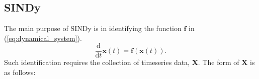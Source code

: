 \documentclass[10pt]{paper}
\begin{document}

\subsection{SINDy} \label{sec:SINDy}
The main purpose of SINDy is in identifying the function $\mathbf f$ in (\ref{eq:dynamical_system}). 
\begin{equation}\label{eq:dynamical_system}
	\frac{\mathrm d}{\mathrm dt} \mathbf x(t) = \mathbf f (\mathbf x(t)).
\end{equation}
Such identification requires the collection of timeseries data, $\mathbf X$. The form of $\mathbf X$ is as follows: 
\end{document}

